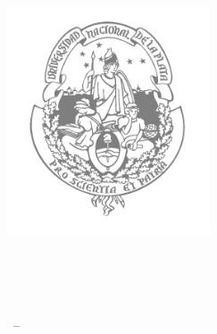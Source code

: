 
\begin{titlepage}

\begin{addmargin}[-1cm]{-3cm}
\begin{center}
\large

\hfill
\vfill

\begingroup
\color{Maroon}\spacedallcaps{\myTitle} \\ \bigskip %
\endgroup

\spacedlowsmallcaps{\myName} %

\vfill

\includegraphics[width=6cm]{gfx/unlp} \\ \medskip %

\mySubtitle \\ \medskip %
\myFaculty \\
\myUni \\ \bigskip

\myTime\ -- \myVersion %

\vfill

\end{center}
\end{addmargin}

\end{titlepage}